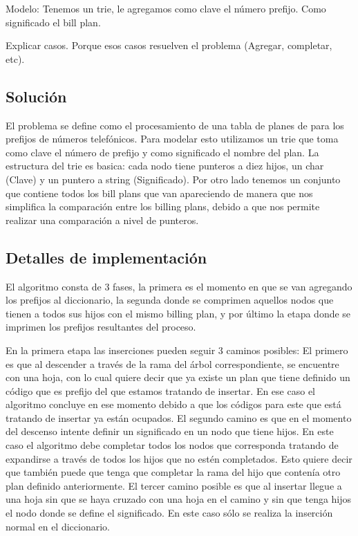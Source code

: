 Modelo: Tenemos un trie, le agregamos como clave el número prefijo. Como significado
el bill plan.

Explicar casos. Porque esos casos resuelven el problema (Agregar, completar, etc).

\subsection*{Solución}

El problema se define como el procesamiento de una tabla de planes de para los
prefijos de números telefónicos. Para modelar esto utilizamos un trie que
toma como clave el número de prefijo y como significado el nombre del plan.
La estructura del trie es basica: cada nodo tiene punteros a diez hijos,
un char (Clave) y un puntero a string (Significado). Por otro lado tenemos
un conjunto que contiene todos los bill plans que van apareciendo de manera
que nos simplifica la comparación entre los billing plans, debido a que
nos permite realizar una comparación a nivel de punteros.

\subsection*{Detalles de implementación}

El algoritmo consta de 3 fases, la primera es el momento en que se van agregando los prefijos
al diccionario, la segunda donde se comprimen aquellos nodos que tienen a todos sus hijos
con el mismo billing plan, y por último la etapa donde se imprimen los prefijos resultantes 
del proceso.

En la primera etapa las inserciones pueden seguir 3 caminos posibles:
El primero es que al descender a través de la rama del árbol correspondiente, 
se encuentre con una hoja, con lo cual quiere decir que ya existe un plan que tiene definido
un código que es prefijo del que estamos tratando de insertar. En ese caso el algoritmo 
concluye en ese momento debido a que los códigos para este que está tratando de insertar ya están
ocupados.
El segundo camino es que en el momento del descenso intente definir un significado en un nodo que tiene
hijos. En este caso el algoritmo debe completar todos los nodos que corresponda tratando de expandirse
a través de todos los hijos que no estén completados. Esto quiere decir que también puede que tenga que completar 
la rama del hijo que contenía otro plan definido anteriormente.
El tercer camino posible es que al insertar llegue a una hoja sin que se haya cruzado con una hoja en el camino
y sin que tenga hijos el nodo donde se define el significado. En este caso sólo se realiza la inserción 
normal en el diccionario.


